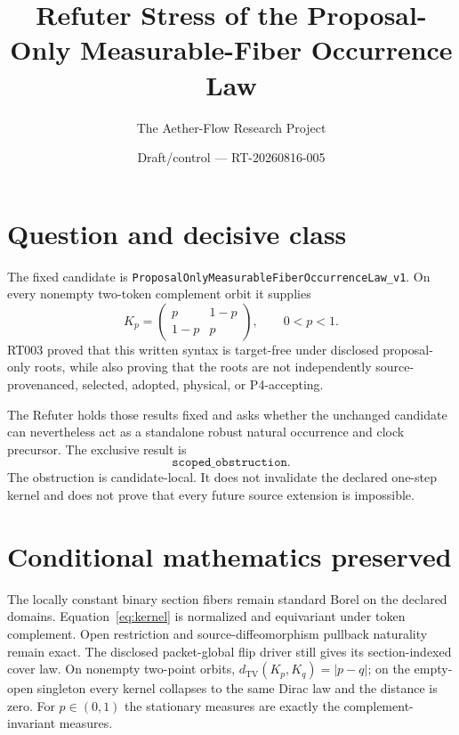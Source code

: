 \documentclass[11pt]{article}
\title{Refuter Stress of the Proposal-Only Measurable-Fiber Occurrence Law}
\author{The Aether-Flow Research Project}
\date{Draft/control --- RT-20260816-005}
\newcommand{\TV}{\operatorname{TV}}
\begin{document}
\maketitle

\begin{center}
\end{center}

\section{Question and decisive class}

The fixed candidate is
\texttt{ProposalOnlyMeasurableFiberOccurrenceLaw\_v1}. On every nonempty
two-token complement orbit it supplies
\begin{equation}
 K_p=\begin{pmatrix}p&1-p\\1-p&p\end{pmatrix},
 \qquad 0<p<1.
 \label{eq:kernel}
\end{equation}
RT003 proved that this written syntax is target-free under disclosed
proposal-only roots, while also proving that the roots are not independently
source-provenanced, selected, adopted, physical, or P4-accepting.

The Refuter holds those results fixed and asks whether the unchanged candidate
can nevertheless act as a standalone robust natural occurrence and clock
precursor. The exclusive result is
\[
 \boxed{\texttt{scoped\_obstruction}}.
\]
The obstruction is candidate-local. It does not invalidate the declared
one-step kernel and does not prove that every future source extension is
impossible.

\section{Conditional mathematics preserved}

The locally constant binary section fibers remain standard Borel on the
declared domains. Equation~\eqref{eq:kernel} is normalized and equivariant
under token complement. Open restriction and source-diffeomorphism pullback
naturality remain exact. The disclosed packet-global flip driver still gives
its section-indexed cover law. On nonempty two-point orbits,
$d_{\TV}(K_p,K_q)=|p-q|$; on the empty-open singleton every kernel collapses
to the same Dirac law and the distance is zero. For $p\in(0,1)$ the stationary
measures are exactly the complement-invariant measures.
\end{document}
